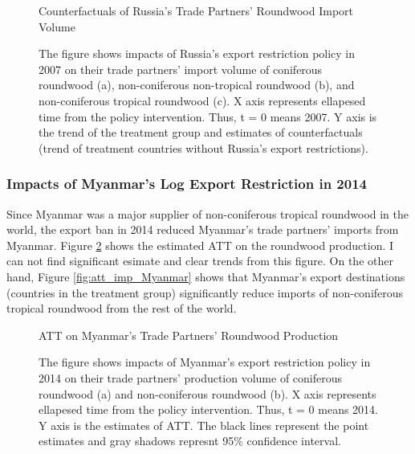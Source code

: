 \documentclass[a4paper,12pt]{article}
\begin{document}
\begin{figure}[htbp] 
    \centering
    \caption{Counterfactuals of Russia's Trade Partners' Roundwood Import Volume}
    \caption*{\small{The figure shows impacts of Russia's export restriction policy in 2007 on their trade partners' import volume of coniferous roundwood (a), non-coniferous non-tropical roundwood (b), and non-coniferous tropical roundwood (c). X axis represents ellapesed time from the policy intervention. Thus, t = 0 means 2007. Y axis is the trend of the treatment group and estimates of counterfactuals (trend of treatment countries without Russia's export restrictions).}}
    \label{fig:cf_imp_Russia}
\end{figure}

\subsubsection{Impacts of Myanmar's Log Export Restriction in 2014}
Since Myanmar was a major supplier of non-coniferous tropical roundwood in the world, the export ban in 2014 reduced Myanmar's trade partners' imports from Myanmar. Figure \ref{fig:att_prod_Myanmar} shows the estimated ATT on the roundwood production. I can not find significant esimate and clear trends from this figure. On the other hand, Figure \ref{fig:att_imp_Myanmar} shows that Myanmar's export destinations (countries in the treatment group) significantly reduce imports of non-coniferous tropical roundwood from the rest of the world.

\begin{figure}[htbp] 
    \centering
    \caption{ATT on Myanmar's Trade Partners' Roundwood Production}
    \caption*{\small{The figure shows impacts of Myanmar's export restriction policy in 2014 on their trade partners' production volume of coniferous roundwood (a) and non-coniferous roundwood (b). X axis represents ellapesed time from the policy intervention. Thus, t = 0 means 2014. Y axis is the estimates of ATT. The black lines represent the point estimates and gray shadows represnt 95\% confidence interval.}}
    \label{fig:att_prod_Myanmar}
\end{figure}
\end{document}
